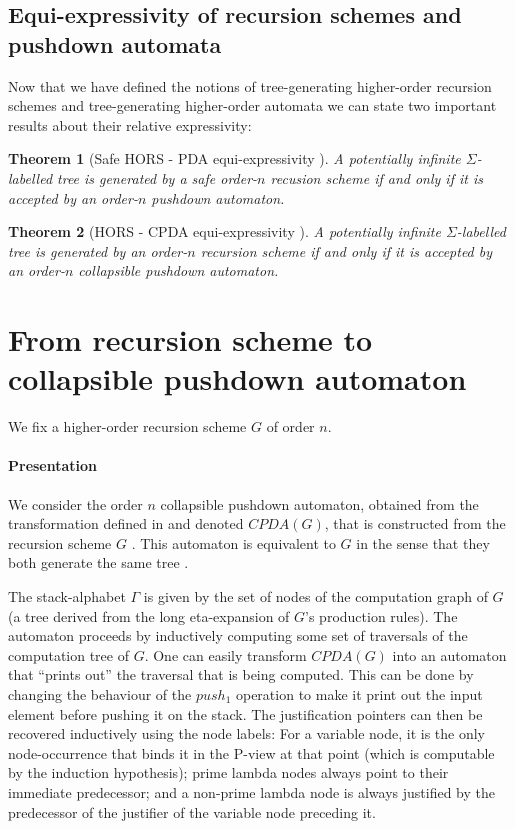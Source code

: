\documentclass[a4paper,draft]{article}[12pt]
\newtheorem{theorem}{Theorem}[section]
\theoremstyle{remark}
\theoremstyle{definition}
\begin{document}
\subsection{Equi-expressivity of recursion schemes and pushdown automata}

Now that we have defined the notions of tree-generating higher-order recursion schemes and 
tree-generating higher-order automata we can state two important results about their relative expressivity:

\begin{theorem}[Safe HORS - PDA equi-expressivity \cite{KNU02}]
A potentially infinite  $\Sigma$-labelled tree is generated by a \emph{safe} order-$n$ recusion scheme if and only if it is accepted by an order-$n$ pushdown automaton.
\end{theorem}

\begin{theorem}[HORS - CPDA equi-expressivity \cite{hmos-lics08}]
	A potentially infinite $\Sigma$-labelled tree is generated by an order-$n$ recursion scheme if and only if it is accepted by an order-$n$ collapsible pushdown automaton.
\end{theorem}


\section{From recursion scheme to collapsible pushdown automaton}

We fix a higher-order recursion scheme $G$ of order $n$.

\paragraph{Presentation}
We consider the order $n$ collapsible pushdown automaton, obtained from the transformation defined in \cite{hmos-lics08} and denoted $CPDA(G)$, that is constructed from the recursion scheme $G$ \cite[Definition 5.2]{hague-collaps-full}. This automaton is equivalent to $G$ in the sense that they both generate the same tree \cite{hmos-lics08}.

The stack-alphabet $\Gamma$ is given by the set of nodes of the computation graph of $G$ (a tree derived from the long eta-expansion of $G$'s production rules). The automaton proceeds by inductively computing some set of traversals of the computation tree of $G$. One can easily transform $CPDA(G)$ into an automaton that ``prints out'' the traversal that is being computed. This can be done by changing the behaviour of the $push_1$ operation to make it print out the input element before pushing it on the stack. The justification pointers can then be recovered inductively using the node labels: For a variable node, it is the only node-occurrence that binds it in the P-view at that point (which is computable by the induction hypothesis); prime lambda nodes always point to their immediate predecessor; and a non-prime lambda node is always justified by the predecessor of the justifier of the variable node preceding it.
\end{document}
